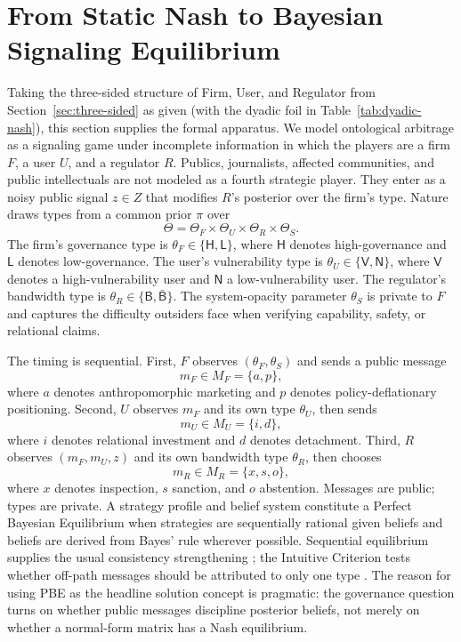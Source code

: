 \section{From Static Nash to Bayesian Signaling Equilibrium}
\label{sec:bayesian}

Taking the three-sided structure of Firm, User, and Regulator from Section~\ref{sec:three-sided} as given (with the dyadic foil in Table~\ref{tab:dyadic-nash}), this section supplies the formal apparatus. We model ontological arbitrage as a signaling game under incomplete information in which the players are a firm $F$, a user $U$, and a regulator $R$. Publics, journalists, affected communities, and public intellectuals are not
modeled as a fourth strategic player. They enter as a noisy public signal
$z \in Z$ that modifies $R$'s posterior over the firm's type. Nature draws
types from a common prior $\pi$ over
\[
\Theta =
\Theta_F \times \Theta_U \times \Theta_R \times \Theta_S .
\]
The firm's governance type is
$\theta_F \in \{\mathsf{H},\mathsf{L}\}$, where $\mathsf{H}$ denotes
high-governance and $\mathsf{L}$ denotes low-governance. The user's vulnerability
type is $\theta_U \in \{\mathsf{V},\mathsf{N}\}$, where $\mathsf{V}$ denotes a
high-vulnerability user and $\mathsf{N}$ a low-vulnerability user. The
regulator's bandwidth type is $\theta_R \in \{\mathsf{B},\bar{\mathsf{B}}\}$.
The system-opacity parameter $\theta_S$ is private to $F$ and captures the
difficulty outsiders face when verifying capability, safety, or relational
claims.

The timing is sequential. First, $F$ observes $(\theta_F,\theta_S)$ and sends a
public message
\[
m_F \in M_F=\{a,p\},
\]
where $a$ denotes anthropomorphic marketing and $p$ denotes policy-deflationary
positioning. Second, $U$ observes $m_F$ and its own type $\theta_U$, then sends
\[
m_U \in M_U=\{i,d\},
\]
where $i$ denotes relational investment and $d$ denotes detachment. Third, $R$
observes $(m_F,m_U,z)$ and its own bandwidth type $\theta_R$, then chooses
\[
m_R \in M_R=\{x,s,o\},
\]
where $x$ denotes inspection, $s$ sanction, and $o$ abstention. Messages are
public; types are private. A strategy profile and belief system constitute a
Perfect Bayesian Equilibrium when strategies are sequentially rational given
beliefs and beliefs are derived from Bayes' rule wherever possible. Sequential
equilibrium supplies the usual consistency strengthening \citep{kreps_wilson1982};
the Intuitive Criterion tests whether off-path messages should be attributed to
only one type \citep{cho_kreps1987}. The reason for using PBE as the headline
solution concept is pragmatic: the governance question turns on whether public
messages discipline posterior beliefs, not merely on whether a normal-form
matrix has a Nash equilibrium.

